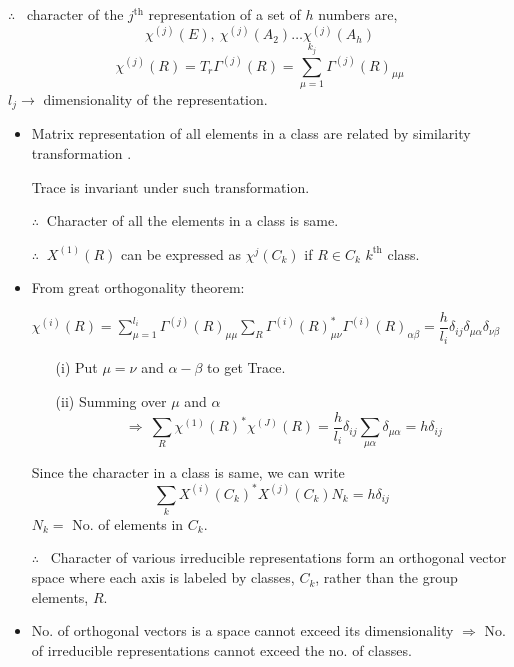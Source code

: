 $\therefore$ \ character of the $j^{\text{th}}$ representation of a set of $h$ numbers are, 
$$
\chi^{(j)}(E), \ \chi^{(j)}(A_{2})\ldots \chi^{(j)}(A_{h})
$$
$$
\chi^{(j)}(R)=T_{r}\Gamma^{(j)}(R)=\sum\limits^{k_{j}}_{\mu=1}\Gamma^{(j)}(R)_{\mu\mu}
$$
$l_{j} \to$ dimensionality of the representation.
\begin{itemize}
\item Matrix representation of all elements in a class are related by similarity transformation .

Trace is invariant under such transformation.

$\therefore \ $ Character of all the elements in a class is same.

$\therefore \ $ $X^{(1)}(R)$ can be expressed as $\chi^{j}(C_{k})$ if $R\in C_{k}$ $k^{\text{th}}$ class.

\item From great orthogonality theorem:

$\chi^{(i)}(R)=\sum\limits^{l_{i}}_{\mu=1}\Gamma^{(j)}(R)_{\mu\mu}\sum\limits_{R}\Gamma^{(i)}(R)^{*}_{\mu\nu}\Gamma^{(i)}(R)_{\alpha\beta}=\dfrac{h}{l_{i}}\delta_{ij}\delta_{\mu\alpha}\delta_{\nu\beta}$ 
\begin{itemize}
\item[(i)] Put $\mu=\nu$ and $\alpha-\beta$ to get Trace.

\item[(ii)] Summing over $\mu$ and $\alpha$
$$
\Rightarrow \ \sum\limits_{R}\chi^{(1)}(R)^{*}\chi^{(J)}(R)=\dfrac{h}{l_{i}}\delta_{ij}\sum\limits_{\mu\alpha}\delta_{\mu\alpha}=h\delta_{ij}
$$
\end{itemize}
Since the character in a class is same, we can write
\begin{equation*}
\sum\limits_{k}X^{(i)}(C_{k})^{*}X^{(j)}(C_{k})N_{k}=h\delta_{ij}\tag{A}\label{lec7-eqA}
\end{equation*}
$N_{k}=$ No. of elements in $C_{k}$.

$\therefore$ \ Character of various irreducible representations form an orthogonal vector space where each axis is labeled by classes, $C_{k}$, rather than the group elements, $R$.

\item No. of orthogonal vectors is a space cannot exceed its dimensionality $\Rightarrow$ No. of irreducible representations cannot exceed the no. of classes.
\end{itemize}


